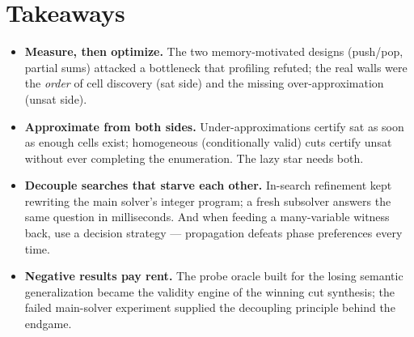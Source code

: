 \documentclass[11pt]{article}
\begin{document}
\section{Takeaways}

\begin{itemize}
\item \textbf{Measure, then optimize.} The two memory-motivated designs
  (push/pop, partial sums) attacked a bottleneck that profiling refuted;
  the real walls were the \emph{order} of cell discovery (sat side) and
  the missing over-approximation (unsat side).
\item \textbf{Approximate from both sides.} Under-approximations certify
  \textsf{sat} as soon as enough cells exist; homogeneous (conditionally
  valid) cuts certify \textsf{unsat} without ever completing the
  enumeration. The lazy star needs both.
\item \textbf{Decouple searches that starve each other.} In-search
  refinement kept rewriting the main solver's integer program; a fresh
  subsolver answers the same question in milliseconds. And when feeding a
  many-variable witness back, use a decision strategy --- propagation
  defeats phase preferences every time.
\item \textbf{Negative results pay rent.} The probe oracle built for the
  losing semantic generalization became the validity engine of the winning
  cut synthesis; the failed main-solver experiment supplied the
  decoupling principle behind the endgame.
\end{itemize}
\end{document}
